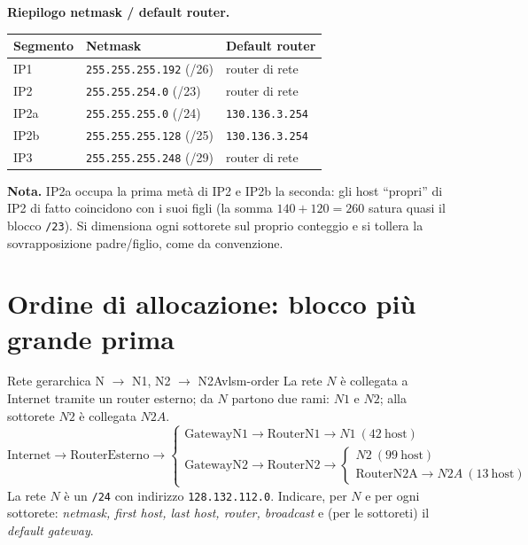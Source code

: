 \documentclass{report}
\begin{document}
\begin{solution}
\textbf{Riepilogo netmask / default router.}
\begin{center}
\begin{tabular}{lll}
\hline
Segmento & Netmask & Default router \\
\hline
IP1  & \texttt{255.255.255.192} (/26) & router di rete \\
IP2  & \texttt{255.255.254.0} (/23)   & router di rete \\
IP2a & \texttt{255.255.255.0} (/24)   & \texttt{130.136.3.254} \\
IP2b & \texttt{255.255.255.128} (/25) & \texttt{130.136.3.254} \\
IP3  & \texttt{255.255.255.248} (/29) & router di rete \\
\hline
\end{tabular}
\end{center}

\textbf{Nota.} IP2a occupa la prima metà di IP2 e IP2b la seconda: gli host
``propri'' di IP2 di fatto coincidono con i suoi figli (la somma $140+120=260$
satura quasi il blocco \texttt{/23}). Si dimensiona ogni sottorete sul proprio
conteggio e si tollera la sovrapposizione padre/figlio, come da convenzione.
\end{solution}


\section{Ordine di allocazione: blocco più grande prima}

\begin{Exercise}{Rete gerarchica N $\to$ N1, N2 $\to$ N2A}{vlsm-order}
La rete $N$ è collegata a Internet tramite un router esterno; da $N$ partono due
rami: $N1$ e $N2$; alla sottorete $N2$ è collegata $N2A$.
\[
\text{Internet}\to\text{RouterEsterno}\to
\begin{cases}
\text{GatewayN1}\to\text{RouterN1}\to N1\ (42\ \text{host})\\[2pt]
\text{GatewayN2}\to\text{RouterN2}\to
\begin{cases}
N2\ (99\ \text{host})\\
\text{RouterN2A}\to N2A\ (13\ \text{host})
\end{cases}
\end{cases}
\]
La rete $N$ è un \texttt{/24} con indirizzo \texttt{128.132.112.0}. Indicare, per
$N$ e per ogni sottorete: \emph{netmask, first host, last host, router,
broadcast} e (per le sottoreti) il \emph{default gateway}.
\end{Exercise}
\end{document}
